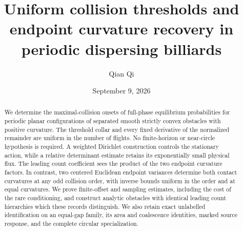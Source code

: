 
\title[Collision thresholds and endpoint curvatures]{Uniform collision thresholds and endpoint curvature recovery
in periodic dispersing billiards}
\author{Qian Qi}
\date{September 9, 2026}

\begin{abstract}
We determine the maximal-collision onsets of full-phase equilibrium
probabilities for periodic planar configurations of separated smooth
strictly convex obstacles with positive curvature. The threshold
collar and every fixed derivative of the normalized remainder are
uniform in the number of flights. No finite-horizon or near-circle
hypothesis is required. A weighted Dirichlet construction controls the
stationary action, while a relative determinant estimate retains its
exponentially small physical flux. The leading count coefficient sees
the product of the two endpoint curvature factors. In contrast, two
centered Euclidean endpoint variances determine both contact curvatures
at any odd collision order, with inverse bounds uniform in the order
and at equal curvatures. We prove finite-offset and sampling estimates,
including the cost of the rare conditioning, and construct analytic
obstacles with identical leading count hierarchies which these records
distinguish. We also retain exact unlabelled identification on an
equal-gap family, its area and coalescence identities, marked source
response, and the complete circular specialization.
\end{abstract}
\maketitle







\appendix









